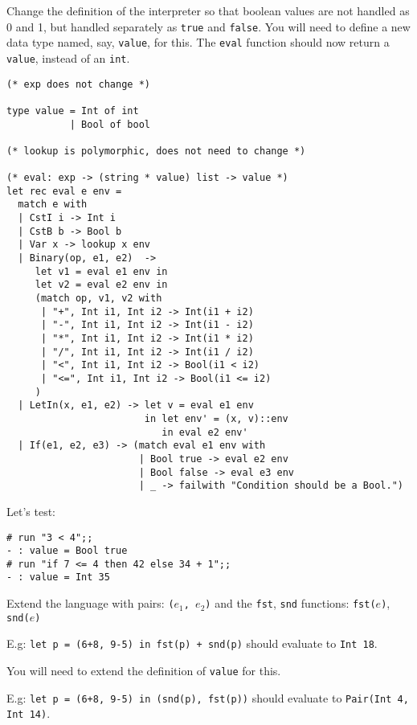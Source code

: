 \documentclass[addpoints]{exam}
\begin{document}
\begin{questions}
  
  \question
  Change the definition of the interpreter so that boolean values are not handled
  as 0 and 1, but handled separately as \texttt{true} and \texttt{false}.
  You will need to define a new data type named, say, \texttt{value}, for this.
  The \texttt{eval} function should now return a \texttt{value},
  instead of an \texttt{int}.

  \begin{solution}
    \begin{verbatim}
(* exp does not change *)

type value = Int of int
           | Bool of bool

(* lookup is polymorphic, does not need to change *)

(* eval: exp -> (string * value) list -> value *)
let rec eval e env =
  match e with
  | CstI i -> Int i
  | CstB b -> Bool b
  | Var x -> lookup x env
  | Binary(op, e1, e2)  ->
     let v1 = eval e1 env in
     let v2 = eval e2 env in
     (match op, v1, v2 with
      | "+", Int i1, Int i2 -> Int(i1 + i2)
      | "-", Int i1, Int i2 -> Int(i1 - i2)
      | "*", Int i1, Int i2 -> Int(i1 * i2)
      | "/", Int i1, Int i2 -> Int(i1 / i2)
      | "<", Int i1, Int i2 -> Bool(i1 < i2)
      | "<=", Int i1, Int i2 -> Bool(i1 <= i2)
     )
  | LetIn(x, e1, e2) -> let v = eval e1 env
                        in let env' = (x, v)::env
                           in eval e2 env'
  | If(e1, e2, e3) -> (match eval e1 env with
                       | Bool true -> eval e2 env
                       | Bool false -> eval e3 env
                       | _ -> failwith "Condition should be a Bool.")
    \end{verbatim}


    Let's test:
    \begin{verbatim}
# run "3 < 4";;
- : value = Bool true
# run "if 7 <= 4 then 42 else 34 + 1";;
- : value = Int 35
    \end{verbatim}
  \end{solution}
  

  \question
  Extend the language with pairs: \texttt{($e_1$, $e_2$)}
  and the \texttt{fst}, \texttt{snd}
  functions: \texttt{fst($e$)}, \texttt{snd($e$)} 

  E.g: \texttt{let p = (6+8, 9-5) in fst(p) + snd(p)}
  should evaluate to \texttt{Int 18}.

  You will need to extend the definition of \texttt{value} for this.

  E.g: \texttt{let p = (6+8, 9-5) in (snd(p), fst(p))}
  should evaluate to \texttt{Pair(Int 4, Int 14)}.


\end{questions}
\end{document}
